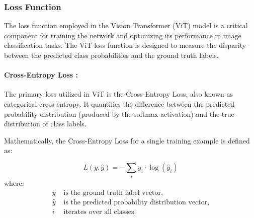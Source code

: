 \subsubsection{Loss Function}
The loss function employed in the Vision Transformer (ViT) model is a critical component for training the network and optimizing its performance in image classification tasks. The ViT loss function is designed to measure the disparity between the predicted class probabilities and the ground truth labels.

\paragraph{Cross-Entropy Loss :}
The primary loss utilized in ViT is the Cross-Entropy Loss, also known as categorical cross-entropy. It quantifies the difference between the predicted probability distribution (produced by the softmax activation) and the true distribution of class labels.

\noindent Mathematically, the Cross-Entropy Loss for a single training example is defined as:

\begin{equation}
    L(y, \hat{y}) = -\sum_i y_i \cdot \log(\hat{y}_i) \label{eq:loss_function}
\end{equation}
\noindent where:
\begin{align*}
    y       & \text{ is the ground truth label vector,}                 \\
    \hat{y} & \text{ is the predicted probability distribution vector,} \\
    i       & \text{ iterates over all classes.}
\end{align*}

